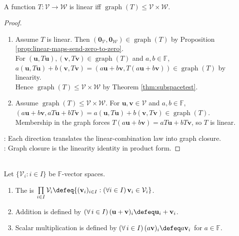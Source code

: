 \begin{proposition} \label{prop:graph-subspace-characterizes-linearity} \\
A function $T:\mathcal{V}\to\mathcal{W}$ is linear iff $\operatorname{graph}(T)\leq\mathcal{V}\times\mathcal{W}$.
\begin{proof}
\begin{enumerate}[label=\roman*.]
\setlength{\itemsep}{0pt}
\item[$(\Rightarrow)$] Assume $T$ is linear. Then $(\mathbf{0}_{\mathcal{V}},\mathbf{0}_{\mathcal{W}})\in\operatorname{graph}(T)$ by Proposition \ref{prop:linear-maps-send-zero-to-zero}.\\
For $(\mathbf{u},T\mathbf{u}),(\mathbf{v},T\mathbf{v})\in\operatorname{graph}(T)$ and $a,b\in\mathbb{F}$, $a(\mathbf{u},T\mathbf{u})+b(\mathbf{v},T\mathbf{v})=(a\mathbf{u}+b\mathbf{v},T(a\mathbf{u}+b\mathbf{v}))\in\operatorname{graph}(T)$ by linearity.\\
Hence $\operatorname{graph}(T)\leq\mathcal{V}\times\mathcal{W}$ by Theorem \ref{thm:subspacetest}.
\item[$(\Leftarrow)$] Assume $\operatorname{graph}(T)\leq\mathcal{V}\times\mathcal{W}$. For $\mathbf{u},\mathbf{v}\in\mathcal{V}$ and $a,b\in\mathbb{F}$, $(a\mathbf{u}+b\mathbf{v},aT\mathbf{u}+bT\mathbf{v})=a(\mathbf{u},T\mathbf{u})+b(\mathbf{v},T\mathbf{v})\in\operatorname{graph}(T)$.\\
Membership in the graph forces $T(a\mathbf{u}+b\mathbf{v})=aT\mathbf{u}+bT\mathbf{v}$, so $T$ is linear.
\end{enumerate}
: Each direction translates the linear-combination law into graph closure.\\
: Graph closure is the linearity identity in product form.
\end{proof}
\end{proposition}

\begin{definition} \label{def:external-product-family} \\
Let $\{\mathcal{V}_i:i\in I\}$ be $\mathbb{F}$-vector spaces.
\begin{enumerate}[label=(\roman*)]
\setlength{\itemsep}{0pt}
\item The  is $\prod\limits_{i\in I}\mathcal{V}_i\defeq\{(\mathbf{v}_i)_{i\in I}:(\forall i\in I)\,\mathbf{v}_i\in\mathcal{V}_i\}$.
\item Addition is defined by $(\forall\,i\in I)\,(\mathbf{u}+\mathbf{v})_i\defeq\mathbf{u}_i+\mathbf{v}_i$.
\item Scalar multiplication is defined by $(\forall\,i\in I)\,(a\mathbf{v})_i\defeq a\mathbf{v}_i$ for $a\in\mathbb{F}$.
\end{enumerate}
\end{definition}

